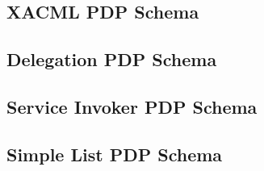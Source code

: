 \documentclass{article}
\begin{document}
\subsection{XACML PDP Schema}


\subsection{Delegation PDP Schema}


\subsection{Service Invoker PDP Schema}


\subsection{Simple List PDP Schema}



\end{document}
